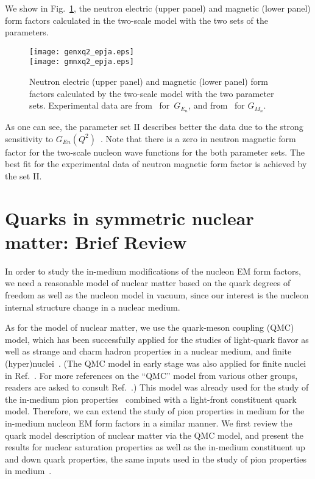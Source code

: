\documentclass[preprint,aps,showpacs,floatfix]{revtex4}
\begin{document}
We show in Fig.~\ref{gengmn}, the neutron electric (upper panel) and magnetic (lower panel) 
form factors calculated in 
the two-scale model with the two sets of the parameters.   
\begin{figure}[htbp]
\texttt{[image: genxq2\_epja.eps]}
\\
\vspace*{1.5cm}
\texttt{[image: gmnxq2\_epja.eps]}
\caption{
Neutron electric (upper panel) and magnetic (lower panel) form factors  
calculated by the two-scale model with the two parameter sets.
Experimental data are from~\cite{Holer1976,Gao2003} for~$G_{E_n}$, and   
from~\cite{Albrecht1968,Rock1982,Bruins1995,Anklin1998,Kubon2002,Anderson2007,Lachniet2009} 
for $G_{M_n}$.
}
\label{gengmn}
\end{figure}


As one can see, the parameter set II describes better the data due to the strong 
sensitivity to $G_{En}(Q^2)$~\cite{afsbw}.
Note that there is a zero in neutron magnetic form factor for the two-scale nucleon wave functions 
for the both parameter sets. The best fit for the experimental data of neutron magnetic form factor 
is achieved by the set II.






\newpage

\section{Quarks in symmetric nuclear matter: Brief Review}
\label{qmatter}

In order to study the in-medium modifications of the nucleon EM 
form factors, we need a reasonable model of nuclear matter based 
on the quark degrees of freedom as well as the nucleon model in vacuum, 
since our interest is the nucleon internal structure change in a nuclear medium. 

As for the model of nuclear matter, we use the quark-meson coupling (QMC) model, 
which has been successfully applied for the studies of light-quark flavor as well as 
strange and charm hadron properties in a nuclear medium, 
and finite (hyper)nuclei~\cite{QMCreview,QMCfinite}. 
(The QMC model in early stage was also applied for finite nuclei 
in Ref.~\cite{BlundenFN}. For more references on the ``QMC'' model from 
various other groups, readers are asked to consult Ref.~\cite{QMCreview}.)  
This model was already used for the study of the in-medium pion 
properties~\cite{pimedium1,pimedium2,pimedium3,pimedium4} 
combined with a light-front constituent 
quark model. Therefore, we can extend the study of pion properties in medium 
for the in-medium nucleon EM form factors in a similar manner.
We first review the quark model description of nuclear matter via the QMC model, 
and present the results for nuclear saturation properties  
as well as the in-medium constituent up and down quark properties,  
the same inputs used in the study of pion properties 
in medium~\cite{pimedium1,pimedium2,pimedium3,pimedium4}.
\end{document}
